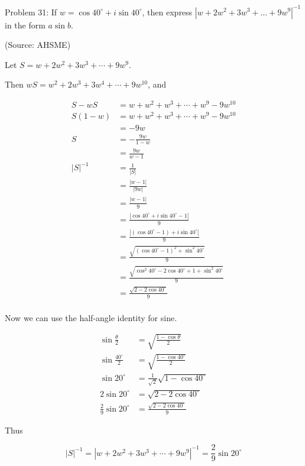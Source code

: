 Problem 31: If $w = \cos 40^\circ + i \sin 40^\circ$, then express $\left|w + 2w^2 + 3w^3 + \dots + 9w^9\right|^{-1}$ in the form $a\sin b$.

(Source: AHSME)

Let $S = w + 2w^2 + 3w^3 + \cdots + 9w^9$.

Then $wS = w^2 + 2w^3 + 3w^4 + \cdots + 9w^{10}$, and

\begin{align*}
S - wS &= w + w^2 + w^3 + \cdots + w^9 - 9w^{10} \\
S(1 - w) &= w + w^2 + w^3 + \cdots + w^9 - 9w^{10} \\
&= -9w \\
S &= - \frac{9w}{1 - w} \\
&= \frac{9w}{w - 1} \\
|S|^{-1} &= \frac{1}{|S|} \\
&= \frac{|w - 1|}{|9w|} \\
&= \frac{|w - 1|}{9} \\
&= \frac{|\cos 40^\circ + i \sin 40^\circ - 1|}{9} \\
&= \frac{|(\cos 40^\circ - 1) + i \sin 40^\circ|}{9} \\
&= \frac{\sqrt{(\cos 40^\circ - 1)^2 + \sin^2 40^\circ}}{9} \\
&= \frac{\sqrt{\cos^2 40^\circ - 2 \cos 40^\circ + 1 + \sin^2 40^\circ}}{9} \\
&= \frac{\sqrt{2 - 2 \cos 40^\circ}}{9} \\
\end{align*}

Now we can use the half-angle identity for sine.

\begin{align*}
\sin \frac{\theta}{2} &= \sqrt{\frac{1 - \cos \theta}{2}} \\
\sin \frac{40^\circ}{2} &= \sqrt{\frac{1 - \cos 40^\circ}{2}} \\
\sin 20^\circ &= \frac{1}{\sqrt 2} \sqrt{1 - \cos 40^\circ} \\
2 \sin 20^\circ &= \sqrt{2 - 2\cos 40^\circ} \\
\frac{2}{9} \sin 20^\circ &= \frac{\sqrt{2 - 2 \cos 40^\circ}}{9}
\end{align*}

Thus

$$ \boxed{|S|^{-1} = |w + 2w^2 + 3w^3 + \cdots + 9w^9|^{-1} = \frac{2}{9} \sin 20^\circ} $$

